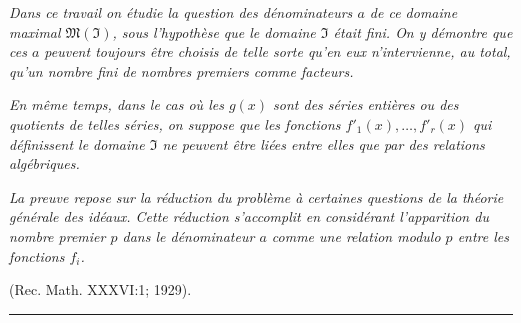 \textit{Dans ce travail on étudie la question des \og{} dénominateurs \fg{} $a$ de ce domaine maximal $\mathfrak{M}(\mathfrak{I})$, sous l'hypothèse que le domaine $\mathfrak{I}$ était fini. On y démontre que ces $a$ peuvent toujours être choisis de telle sorte qu'en eux n'intervienne, au total, qu'un nombre fini de nombres premiers comme facteurs.}

\textit{En même temps, dans le cas où les $g(x)$ sont des séries entières ou des quotients de telles séries, on suppose que les fonctions $f'_1(x),\ldots,f'_r(x)$ qui définissent le domaine $\mathfrak{I}$ ne peuvent être liées entre elles que par des relations algébriques.}

\textit{La preuve repose sur la réduction du problème à certaines questions de la théorie générale des idéaux. Cette réduction s'accomplit en considérant l'apparition du nombre premier $p$ dans le dénominateur $a$ comme une relation modulo $p$ entre les fonctions $f_i$.}

\begin{center}
(Rec. Math. XXXVI:1; 1929).
\end{center}
\endgroup

\bigskip
\noindent\rule{\textwidth}{0.4pt}

\setcounter{footnote}{0}
\clearpage
